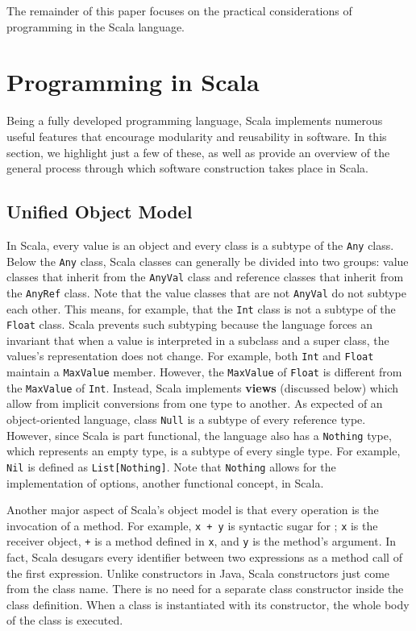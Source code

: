 \documentclass[jou,apacite]{IEEEtran}
\begin{document}
The remainder of this paper focuses on the practical considerations of
programming in the Scala language.

\section{Programming in Scala}
\label{sec:programming-scala}

Being a fully developed programming language, Scala implements numerous useful
features that encourage modularity and reusability in software. In this section,
we highlight just a few of these, as well as provide an overview of the general
process through which software construction takes place in Scala.

\subsection{Unified Object Model}
\label{sec:unified-object-model}

In Scala, every value is an object and every class is a subtype of the
\texttt{Any} class. Below the \texttt{Any} class, Scala classes can generally be
divided into two groups: value classes that inherit from the \texttt{AnyVal}
class and reference classes that inherit from the \texttt{AnyRef} class. Note
that the value classes that are not \texttt{AnyVal} do not subtype each
other. This means, for example, that the \texttt{Int} class is not a subtype of
the \texttt{Float} class. Scala prevents such subtyping because the language
forces an invariant that when a value is interpreted in a subclass and a super
class, the values's representation does not change. For example, both
\texttt{Int} and \texttt{Float} maintain a \texttt{MaxValue} member. However,
the \texttt{MaxValue} of \texttt{Float} is different from the \texttt{MaxValue}
of \texttt{Int}. Instead, Scala implements \textbf{views} (discussed below)
which allow from implicit conversions from one type to another. As expected of
an object-oriented language, class \texttt{Null} is a subtype of every reference
type. However, since Scala is part functional, the language also has a
\texttt{Nothing} type, which represents an empty type, is a subtype of every
single type. For example, \texttt{Nil} is defined as
\texttt{List[Nothing]}. Note that \texttt{Nothing} allows for the implementation
of options, another functional concept, in Scala.

Another major aspect of Scala's object model is that every operation is the
invocation of a method. For example, \texttt{x + y} is syntactic sugar for
; \texttt{x} is the receiver object, \texttt{+} is a method defined
in \texttt{x}, and \texttt{y} is the method's argument. In fact, Scala desugars
every identifier between two expressions as a method call of the first
expression. Unlike constructors in Java, Scala constructors just come from the
class name. There is no need for a separate class constructor inside the class
definition. When a class is instantiated with its constructor, the whole body of
the class is executed.
\end{document}
